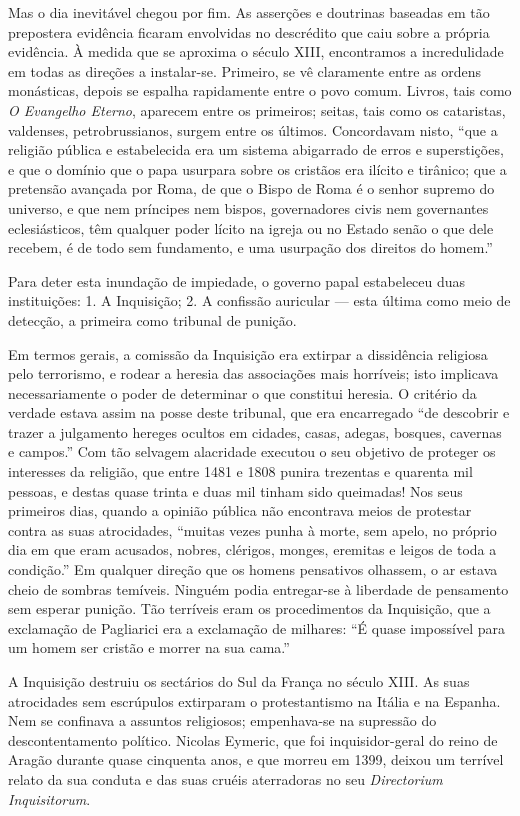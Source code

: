 \documentclass[11pt,a5paper,twoside,openany]{book}
\begin{document}
Mas o dia inevitável chegou por fim. As asserções e doutrinas baseadas em tão prepostera evidência ficaram envolvidas no descrédito que caiu sobre a própria evidência. À medida que se aproxima o século XIII, encontramos a incredulidade em todas as direções a instalar-se. Primeiro, se vê claramente entre as ordens monásticas, depois se espalha rapidamente entre o povo comum. Livros, tais como \textit{O Evangelho Eterno}, aparecem entre os primeiros; seitas, tais como os cataristas, valdenses, petrobrussianos, surgem entre os últimos. Concordavam nisto, “que a religião pública e estabelecida era um sistema abigarrado de erros e superstições, e que o domínio que o papa usurpara sobre os cristãos era ilícito e tirânico; que a pretensão avançada por Roma, de que o Bispo de Roma é o senhor supremo do universo, e que nem príncipes nem bispos, governadores civis nem governantes eclesiásticos, têm qualquer poder lícito na igreja ou no Estado senão o que dele recebem, é de todo sem fundamento, e uma usurpação dos direitos do homem.”

Para deter esta inundação de impiedade, o governo papal estabeleceu duas instituições: 1. A Inquisição; 2. A confissão auricular — esta última como meio de detecção, a primeira como tribunal de punição.

Em termos gerais, a comissão da Inquisição era extirpar a dissidência religiosa pelo terrorismo, e rodear a heresia das associações mais horríveis; isto implicava necessariamente o poder de determinar o que constitui heresia. O critério da verdade estava assim na posse deste tribunal, que era encarregado “de descobrir e trazer a julgamento hereges ocultos em cidades, casas, adegas, bosques, cavernas e campos.” Com tão selvagem alacridade executou o seu objetivo de proteger os interesses da religião, que entre 1481 e 1808 punira trezentas e quarenta mil pessoas, e destas quase trinta e duas mil tinham sido queimadas! Nos seus primeiros dias, quando a opinião pública não encontrava meios de protestar contra as suas atrocidades, “muitas vezes punha à morte, sem apelo, no próprio dia em que eram acusados, nobres, clérigos, monges, eremitas e leigos de toda a condição.” Em qualquer direção que os homens pensativos olhassem, o ar estava cheio de sombras temíveis. Ninguém podia entregar-se à liberdade de pensamento sem esperar punição. Tão terríveis eram os procedimentos da Inquisição, que a exclamação de Pagliarici era a exclamação de milhares: “É quase impossível para um homem ser cristão e morrer na sua cama.”

A Inquisição destruiu os sectários do Sul da França no século XIII. As suas atrocidades sem escrúpulos extirparam o protestantismo na Itália e na Espanha. Nem se confinava a assuntos religiosos; empenhava-se na supressão do descontentamento político. Nicolas Eymeric, que foi inquisidor-geral do reino de Aragão durante quase cinquenta anos, e que morreu em 1399, deixou um terrível relato da sua conduta e das suas cruéis aterradoras no seu \textit{Directorium Inquisitorum}.
\end{document}
